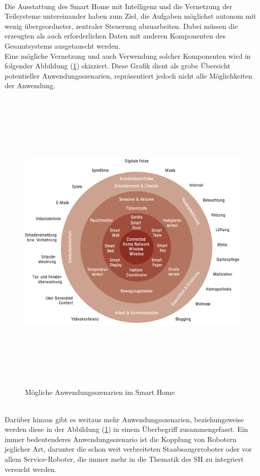         \\
        \linebreak
        Die Ausstattung des Smart Home mit Intelligenz und die Vernetzung der Teilsysteme untereinander haben zum Ziel, die Aufgaben möglichst 
        autonom mit wenig übergeordneter, zentraler Steuerung abzuarbeiten. 
        Dabei müssen die erzeugten als auch erforderlichen Daten mit anderen 
        Komponenten des Gesamtsystems ausgetauscht werden. 
        \\
        Eine mögliche Vernetzung und auch Verwendung solcher Komponenten wird in folgender Abbildung (\ref{pic:szenarien-smarhome}) 
        skizziert. Diese Grafik dient als grobe Übersicht potentieller Anwendungsszenarien, repräsentiert jedoch nicht alle Möglichkeiten der Anwendung. %
        \begin{figure}[hbt!]
            \centering
            \includegraphics[width=15cm,height=15cm,keepaspectratio]{images/Anwendungsszenarien_SH.png}
            \caption{Mögliche Anwendungsszenarien im Smart Home \cite{strese.2010m}}
            \label{pic:szenarien-smarhome}
        \end{figure}
        \\
        Darüber hinaus gibt es weitaus mehr Anwendungsszenarien, beziehungsweise werden diese in der Abbildung 
        (\ref{pic:szenarien-smarhome}) in einem Überbegriff zusammengefasst.
        Ein immer bedeutenderes Anwendungsszenario ist die Kopplung 
        von Robotern jeglicher Art, darunter die schon weit verbreiteten Staubsaugerroboter oder 
        vor allem Service-Roboter, die immer mehr in die Thematik des \acl{SH}  zu integriert versucht werden. 
        
